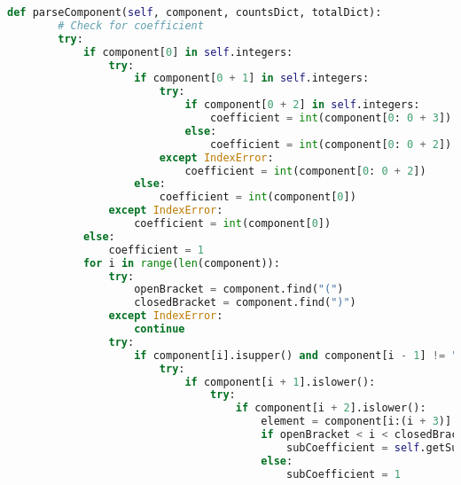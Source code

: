 \documentclass[a4paper,12pt]{article}
\begin{document}
\begin{lstlisting}[language=Python, caption=parseComponent method for finding elements, label={lst:parsecomponent}]
def parseComponent(self, component, countsDict, totalDict):
        # Check for coefficient
        try:
            if component[0] in self.integers:
                try:
                    if component[0 + 1] in self.integers:
                        try:
                            if component[0 + 2] in self.integers:
                                coefficient = int(component[0: 0 + 3])
                            else:
                                coefficient = int(component[0: 0 + 2])
                        except IndexError:
                            coefficient = int(component[0: 0 + 2])
                    else:
                        coefficient = int(component[0])
                except IndexError:
                    coefficient = int(component[0])
            else:
                coefficient = 1
            for i in range(len(component)):
                try:
                    openBracket = component.find("(")
                    closedBracket = component.find(")")
                except IndexError:
                    continue
                try:
                    if component[i].isupper() and component[i - 1] != "(":
                        try:
                            if component[i + 1].islower():
                                try:
                                    if component[i + 2].islower():
                                        element = component[i:(i + 3)]
                                        if openBracket < i < closedBracket:
                                            subCoefficient = self.getSubCoefficient(component)
                                        else:
                                            subCoefficient = 1


\end{lstlisting}
\end{document}
